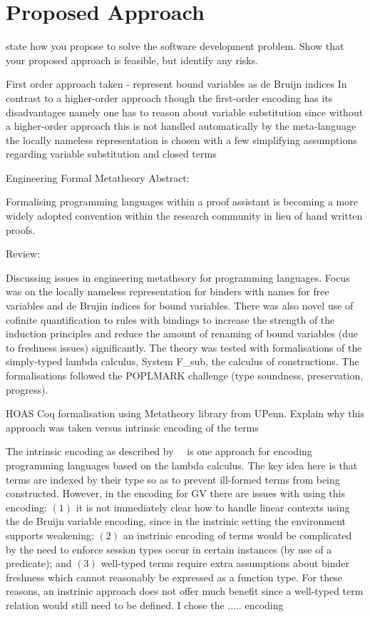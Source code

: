 \documentclass{mprop}
\begin{document}
\section{Proposed Approach}

state how you propose to solve the software development problem. Show that
your proposed approach is feasible, but identify any risks.

First order approach taken - represent bound variables as de Bruijn indices
In contrast to a higher-order approach
though the first-order encoding has its disadvantages namely one has to reason about variable substitution since without a higher-order approach this is not handled automatically by the meta-language
the locally nameless representation is chosen with a few simplifying assumptions regarding variable substitution and closed terms

Engineering Formal Metatheory
Abstract:

Formalising programming languages within a proof assistant is becoming a
more widely adopted convention within the research community in lieu of hand
written proofs.

Review:

Discussing issues in engineering metatheory for programming languages.
Focus was on the locally nameless representation for binders with names
for free variables and de Brujin indices for bound variables. There was
also novel use of cofinite quantification to rules with bindings to increase
the strength of the induction principles and reduce the amount of renaming
of bound variables (due to freshness issues) significantly. The theory was
tested with formalisations of the simply-typed lambda calculus, System F_sub,
the calculus of constructions. The formalisations followed the POPLMARK
challenge (type soundness, preservation, progress).


HOAS Coq formalisation using Metatheory library from UPenn.
Explain why this approach was taken versus intrinsic encoding of the terms

The intrinsic encoding as described by~\citeauthor{Benton:2012:STT}~\cite{Benton:2012:STT} is one approach for encoding programming languages based on the lambda calculus. The key idea here is that terms are indexed by their type so as to prevent ill-formed terms from being constructed. However, in the encoding for GV there are issues with using this encoding: $(1)$ it is not immediately clear how to handle linear contexts using the de Bruijn variable encoding, since in the instrinic setting the environment supports weakening; $(2)$ an instrinic encoding of terms would be complicated by the need to enforce session types occur in certain instances (by use of a predicate); and $(3)$ well-typed terms require extra assumptions about binder freshness which cannot reasonably be expressed as a function type. For these reasons, an instrinic approach does not offer much benefit since a well-typed term relation would still need to be defined. I chose the ..... encoding
\end{document}
